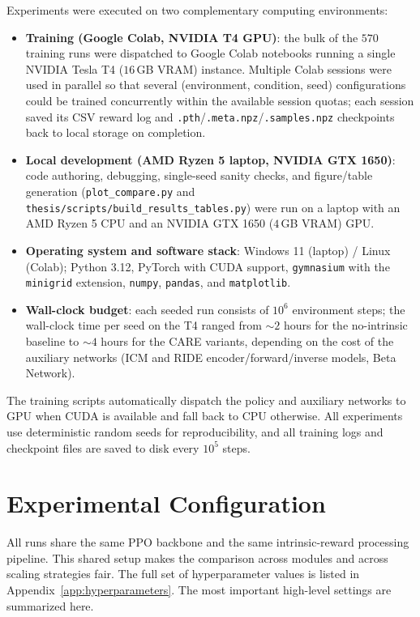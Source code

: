Experiments were executed on two complementary computing environments:
\begin{itemize}
    \item \textbf{Training (Google Colab, NVIDIA T4 GPU)}: the bulk of the $570$ training runs were dispatched to Google Colab notebooks running a single NVIDIA Tesla T4 ($16$\,GB VRAM) instance. Multiple Colab sessions were used in parallel so that several (environment, condition, seed) configurations could be trained concurrently within the available session quotas; each session saved its CSV reward log and \texttt{.pth}/\texttt{.meta.npz}/\texttt{.samples.npz} checkpoints back to local storage on completion.
    \item \textbf{Local development (AMD Ryzen 5 laptop, NVIDIA GTX 1650)}: code authoring, debugging, single-seed sanity checks, and figure/table generation (\texttt{plot\_compare.py} and \texttt{thesis/scripts/build\_results\_tables.py}) were run on a laptop with an AMD Ryzen 5 CPU and an NVIDIA GTX 1650 ($4$\,GB VRAM) GPU.
    \item \textbf{Operating system and software stack}: Windows 11 (laptop) / Linux (Colab); Python 3.12, PyTorch with CUDA support, \texttt{gymnasium} with the \texttt{minigrid} extension, \texttt{numpy}, \texttt{pandas}, and \texttt{matplotlib}.
    \item \textbf{Wall-clock budget}: each seeded run consists of $10^6$ environment steps; the wall-clock time per seed on the T4 ranged from $\sim 2$ hours for the no-intrinsic baseline to $\sim 4$ hours for the CARE variants, depending on the cost of the auxiliary networks (ICM and RIDE encoder/forward/inverse models, Beta Network).
\end{itemize}

The training scripts automatically dispatch the policy and auxiliary networks to GPU when CUDA is available and fall back to CPU otherwise. All experiments use deterministic random seeds for reproducibility, and all training logs and checkpoint files are saved to disk every $10^5$ steps.

\section{Experimental Configuration}
\label{sec:experimental_config}

All runs share the same PPO backbone and the same intrinsic-reward processing pipeline. This shared setup makes the comparison across modules and across scaling strategies fair. The full set of hyperparameter values is listed in Appendix~\ref{app:hyperparameters}. The most important high-level settings are summarized here.

